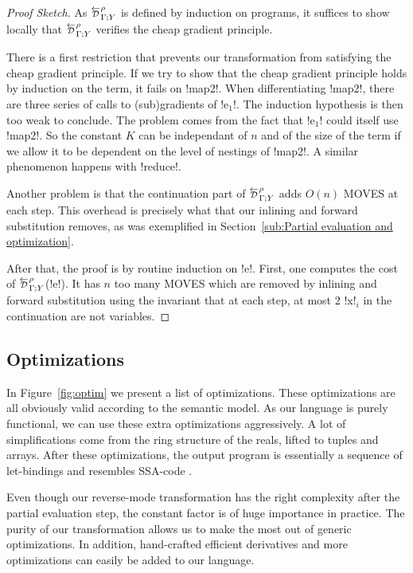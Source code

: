 \begin{proof}[Proof Sketch]
    As $\directD{\rho}{\Gamma}{Y}$ is defined by induction on programs, it suffices to show locally 
that $\directD{\rho}{\Gamma}{Y}$ verifies the cheap gradient principle. 

There is a first restriction that prevents our transformation from satisfying the cheap gradient principle.
If we try to show that the cheap gradient principle holds by induction on the term, it fails on !map2!.
When differentiating !map2!, there are three series of calls to (sub)gradients of !e$_1$!. 
The induction hypothesis is then too weak to conclude. 
The problem comes from the fact that !e$_1$! could itself use !map2!. 
So the constant $K$ can be independant of $n$ and of 
the size of the term if we allow it to be dependent on the level of nestings of !map2!.
A similar phenomenon happens with !reduce!.

Another problem is that the continuation part of $\directD{\rho}{\Gamma}{Y}$ adds $O(n)$ MOVES at each step.
This overhead is precisely what that our inlining and forward substitution removes, 
as was exemplified in Section~\ref{sub:Partial evaluation and optimization}. 

After that, the proof is by routine induction on !e!. 
First, one computes the cost of $\directD{\rho}{\Gamma}{Y}$(!e!).
It has $n$ too many MOVES which are removed by inlining and forward substitution using the invariant that at each step, 
at most 2 !x!$_i$ in the continuation are not variables.
\end{proof}



\subsection{Optimizations} %
\label{sub:Optimizations}

In Figure~\ref{fig:optim} we present a list of optimizations. 
These optimizations are all obviously valid according to the semantic model. 
As our language is purely functional, we can use these extra optimizations aggressively. 
A lot of simplifications come from the ring structure of the reals, lifted to tuples and arrays.
After these optimizations, the output program is essentially a sequence of let-bindings 
and resembles SSA-code \cite{cytron1989efficient}.

Even though our reverse-mode transformation has the right complexity after the partial evaluation step, 
the constant factor is of huge importance in practice. 
The purity of our transformation allows us to make the most out of generic optimizations.  
In addition, hand-crafted efficient derivatives and more optimizations can easily be added to our language.

